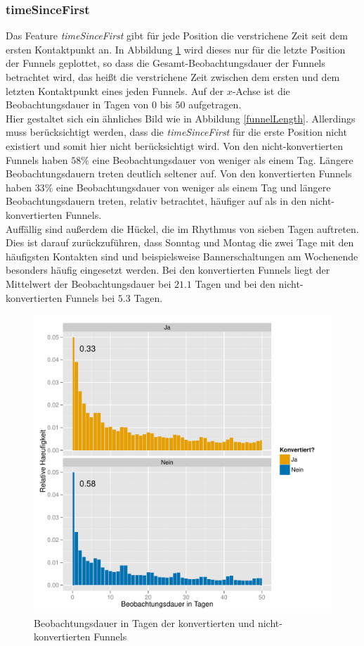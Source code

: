 \subsubsection*{timeSinceFirst}
Das Feature \textit{timeSinceFirst} gibt für jede Position die verstrichene Zeit seit dem ersten Kontaktpunkt an. In Abbildung \ref{timeSinceFirst} wird dieses nur für die letzte Position der Funnels geplottet, so dass die Gesamt-Beobachtungsdauer der Funnels betrachtet wird, das heißt die verstrichene Zeit zwischen dem ersten und dem letzten Kontaktpunkt eines jeden Funnels. Auf der $x$-Achse ist die Beobachtungsdauer in Tagen von $0$ bis $50$ aufgetragen.\\
Hier gestaltet sich ein ähnliches Bild wie in Abbildung \ref{funnelLength}. Allerdings muss berücksichtigt werden, dass die \textit{timeSinceFirst} für die erste Position nicht existiert und somit hier nicht berücksichtigt wird. Von den nicht-konvertierten Funnels haben $58 \%$ eine Beobachtungsdauer von weniger als einem Tag. Längere Beobachtungsdauern treten deutlich seltener auf. Von den konvertierten Funnels haben $33 \%$ eine Beobachtungsdauer von weniger als einem Tag und längere Beobachtungsdauern treten, relativ betrachtet, häufiger auf als in den nicht-konvertierten Funnels.\\
Auffällig sind außerdem die Hückel, die im Rhythmus von sieben Tagen auftreten. Dies ist darauf zurückzuführen, dass Sonntag und Montag die zwei Tage mit den häufigsten Kontakten sind und beispielsweise Bannerschaltungen am Wochenende besonders häufig eingesetzt werden. Bei den konvertierten Funnels liegt der Mittelwert der Beobachtungsdauer bei $21.1$ Tagen und bei den nicht-konvertierten Funnels bei $5.3$ Tagen. 
\begin{figure}[H]
    \centering
    \includegraphics[scale=0.6]{timeSinceFirst_Last.pdf}
    \caption[Beobachtungsdauer in Tagen]{Beobachtungsdauer in Tagen der konvertierten und nicht-konvertierten Funnels}
    \label{timeSinceFirst}
\end{figure}

